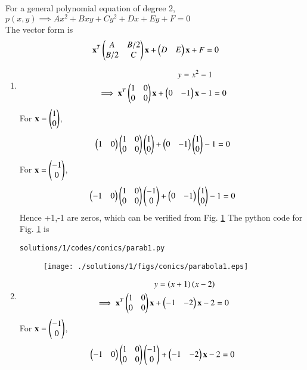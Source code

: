 For a general polynomial equation of degree 2,
\\
$p(x,y) \implies Ax^2+Bxy+Cy^2+Dx+Ey+F=0$
\\
The vector form is 
\begin{align}
\label{eq:5.2.1_vector_form}
\mathbf{x}^T \begin{pmatrix}A & B/2\\B/2 & C\end{pmatrix}\mathbf{x}+ \begin{pmatrix}D & E\end{pmatrix}\mathbf{x}+F=0
\end{align}
\begin{enumerate}
\item 
\begin{align}
y = x^2 - 1 &
\\
\implies \mathbf{x}^T \begin{pmatrix}1 & 0\\0 & 0\end{pmatrix}\mathbf{x}+\begin{pmatrix}0 & -1\end{pmatrix}\mathbf{x}-1&=0
\end{align}
For $\mathbf{x} = \begin{pmatrix}1\\0\end{pmatrix}$,
\begin{align}
 \begin{pmatrix}1 & 0\end{pmatrix}\begin{pmatrix}1 & 0\\0 & 0\end{pmatrix} \begin{pmatrix}1\\0\end{pmatrix}+\begin{pmatrix}0 & -1\end{pmatrix}\begin{pmatrix}1\\0\end{pmatrix}-1= 0
\end{align}
For $\mathbf{x} = \begin{pmatrix}-1\\0\end{pmatrix}$,
\begin{align}
 \begin{pmatrix}-1 & 0\end{pmatrix}\begin{pmatrix}1 & 0\\0 & 0\end{pmatrix} \begin{pmatrix}-1\\0\end{pmatrix}+\begin{pmatrix}0 & -1\end{pmatrix}\begin{pmatrix}1\\0\end{pmatrix}-1= 0
\end{align}
Hence +1,-1 are zeros, which can be verified from Fig. \ref{fig:5.2.1_parab1}
The python code for Fig. \ref{fig:5.2.1_parab1} is
\begin{lstlisting}
solutions/1/codes/conics/parab1.py
\end{lstlisting}
\begin{figure}[!ht]
\texttt{[image: ./solutions/1/figs/conics/parabola1.eps]}
\caption{}
\label{fig:5.2.1_parab1}
\end{figure}
\item 
\begin{align}
y = \left(x+1\right) \left(x-2\right)&
\\
\implies \mathbf{x}^T \begin{pmatrix}1 & 0\\0 & 0\end{pmatrix}\mathbf{x}+\begin{pmatrix}-1 & -2\end{pmatrix}\mathbf{x}-2&=0
\end{align}
For $\mathbf{x} = \begin{pmatrix}-1\\0\end{pmatrix}$,
\begin{align}
\myvec{-1 & 0} \myvec{1 & 0\\0 & 0}\myvec{-1\\0}+\myvec{-1 & -2}\vec{x}-2=0

\end{align}
\end{enumerate}
